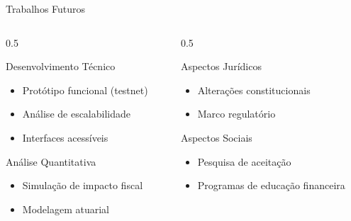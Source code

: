 \documentclass{libs/ufc_format}
\begin{document}
\begin{frame}{Trabalhos Futuros}
    \begin{columns}
        \begin{column}{0.5\textwidth}
            \begin{block}{Desenvolvimento Técnico}
                \begin{itemize}
                    \item Protótipo funcional (testnet)
                    \item Análise de escalabilidade
                    \item Interfaces acessíveis
                \end{itemize}
            \end{block}
            
            \vspace{0.3cm}
            
            \begin{block}{Análise Quantitativa}
                \begin{itemize}
                    \item Simulação de impacto fiscal
                    \item Modelagem atuarial
                \end{itemize}
            \end{block}
        \end{column}
        \begin{column}{0.5\textwidth}
            \begin{block}{Aspectos Jurídicos}
                \begin{itemize}
                    \item Alterações constitucionais
                    \item Marco regulatório
                \end{itemize}
            \end{block}
            
            \vspace{0.3cm}
            
            \begin{block}{Aspectos Sociais}
                \begin{itemize}
                    \item Pesquisa de aceitação
                    \item Programas de educação financeira
                \end{itemize}
            \end{block}
        \end{column}
    \end{columns}
\end{frame}
\end{document}
